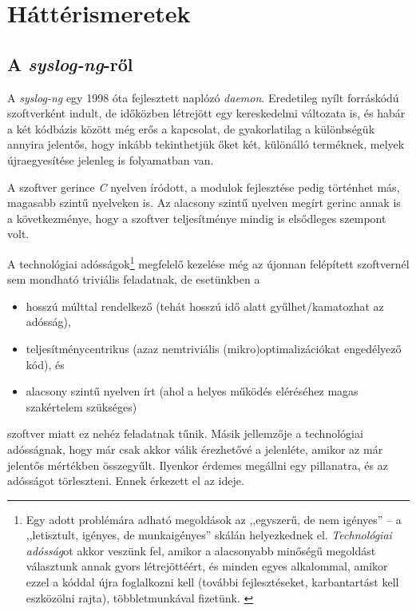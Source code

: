 \chapter{Háttérismeretek}

\section{A \emph{syslog-ng}-ről}

A \emph{syslog-ng} egy 1998 óta fejlesztett naplózó \emph{daemon}. Eredetileg nyílt forráskódú
szoftverként indult, de időközben létrejött egy kereskedelmi változata is, és habár a két kódbázis
között még erős a kapcsolat, de gyakorlatilag a különbségük annyira jelentős, hogy inkább
tekinthetjük őket két, különálló terméknek, melyek újraegyesítése jelenleg is folyamatban van.

A szoftver gerince \emph{C} nyelven íródott, a modulok fejlesztése pedig történhet más, magasabb
szintű nyelveken is. Az alacsony szintű nyelven megírt gerinc annak is a következménye, hogy
a szoftver teljesítménye mindig is elsődleges szempont volt.

A technológiai adósságok\footnote{Egy adott problémára adható megoldások az ,,egyszerű, de nem
    igényes'' -- a ,,letisztult, igényes, de munkaigényes'' skálán helyezkednek el.
    \emph{Technológiai adósság}ot akkor veszünk fel, amikor a alacsonyabb minőségű megoldást
    választunk annak gyors létrejöttéért, és minden egyes alkalommal, amikor ezzel a kóddal újra
foglalkozni kell (további fejlesztéseket, karbantartást kell eszközölni rajta), többletmunkával
fizetünk. \cite{magnusson2014technology}} megfelelő kezelése még az újonnan felépített szoftvernél
sem mondható triviális feladatnak, de esetünkben a
\begin{itemize}
    \item hosszú múlttal rendelkező (tehát hosszú idő alatt gyűlhet/kamatozhat az adósság),
    \item teljesítménycentrikus (azaz nemtriviális (mikro)optimalizációkat engedélyező kód), és
    \item alacsony szintű nyelven írt (ahol a helyes működés eléréséhez magas szakértelem szükséges)
\end{itemize}
szoftver miatt ez nehéz feladatnak tűnik. Másik jellemzője a technológiai adósságnak, hogy már csak
akkor válik érezhetővé a jelenléte, amikor az már jelentős mértékben összegyűlt.  Ilyenkor érdemes
megállni egy pillanatra, és az adósságot törleszteni. Ennek érkezett el az ideje.


